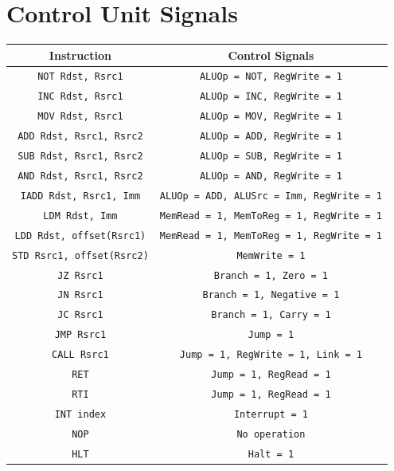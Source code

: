 \documentclass{report}
\begin{document}
\section*{Control Unit Signals}
\begin{table}[H]
    \centering
    \begin{tabular}{|c|c|}
    \hline
    \textbf{Instruction} & \textbf{Control Signals} \\ \hline
    \texttt{NOT Rdst, Rsrc1} & \texttt{ALUOp = NOT, RegWrite = 1} \\ \hline
    \texttt{INC Rdst, Rsrc1} & \texttt{ALUOp = INC, RegWrite = 1} \\ \hline
    \texttt{MOV Rdst, Rsrc1} & \texttt{ALUOp = MOV, RegWrite = 1} \\ \hline
    \texttt{ADD Rdst, Rsrc1, Rsrc2} & \texttt{ALUOp = ADD, RegWrite = 1} \\ \hline
    \texttt{SUB Rdst, Rsrc1, Rsrc2} & \texttt{ALUOp = SUB, RegWrite = 1} \\ \hline
    \texttt{AND Rdst, Rsrc1, Rsrc2} & \texttt{ALUOp = AND, RegWrite = 1} \\ \hline
    \texttt{IADD Rdst, Rsrc1, Imm} & \texttt{ALUOp = ADD, ALUSrc = Imm, RegWrite = 1} \\ \hline
    \texttt{LDM Rdst, Imm} & \texttt{MemRead = 1, MemToReg = 1, RegWrite = 1} \\ \hline
    \texttt{LDD Rdst, offset(Rsrc1)} & \texttt{MemRead = 1, MemToReg = 1, RegWrite = 1} \\ \hline
    \texttt{STD Rsrc1, offset(Rsrc2)} & \texttt{MemWrite = 1} \\ \hline
    \texttt{JZ Rsrc1} & \texttt{Branch = 1, Zero = 1} \\ \hline
    \texttt{JN Rsrc1} & \texttt{Branch = 1, Negative = 1} \\ \hline
    \texttt{JC Rsrc1} & \texttt{Branch = 1, Carry = 1} \\ \hline
    \texttt{JMP Rsrc1} & \texttt{Jump = 1} \\ \hline
    \texttt{CALL Rsrc1} & \texttt{Jump = 1, RegWrite = 1, Link = 1} \\ \hline
    \texttt{RET} & \texttt{Jump = 1, RegRead = 1} \\ \hline
    \texttt{RTI} & \texttt{Jump = 1, RegRead = 1} \\ \hline
    \texttt{INT index} & \texttt{Interrupt = 1} \\ \hline
    \texttt{NOP} & \texttt{No operation} \\ \hline
    \texttt{HLT} & \texttt{Halt = 1} \\ \hline

\end{tabular}
\end{table}
\end{document}
